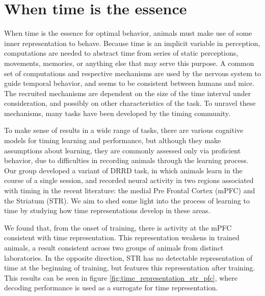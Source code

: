 \chapter{When time is the essence}

When time is the essence for optimal behavior, animals must make use of some inner representation to behave. Because time is an implicit variable in perception, computations are needed to abstract time from series of static perceptions, movements, memories, or anything else that may serve this purpose. A common set of computations and respective mechanisms are used by the nervous system to guide temporal behavior, and seems to be consistent between humans and mice. The recruited mechanisms are dependent on the size of the time interval under consideration, and possibly on other characteristics of the task. To unravel these mechanisms, many tasks have been developed by the timing community.

To make sense of results in a wide range of tasks, there are various cognitive models for timing learning and performance, but although they make assumptions about learning, they are commonly assessed only via proficient behavior, due to difficulties in recording animals through the learning process. Our group developed a variant of DRRD task, in which animals learn in the course of a single session, and recorded neural activity in two regions associated with timing in the recent literature: the medial Pre Frontal Cortex (mPFC) and the Striatum (STR). We aim to shed some light into the process of learning to time by studying how time representations develop in these areas.

We found that, from the onset of training, there is activity at the mPFC consistent with time representation. This representation weakens in trained animals, a result consistent across two groups of animals from distinct laboratories. In the opposite direction, STR has no detectable representation of time at the beginning of training, but features this representation after training. This results can be seen in figure \ref{fig:time_representation_str_pfc}, where decoding performance is used as a surrogate for time representation.

